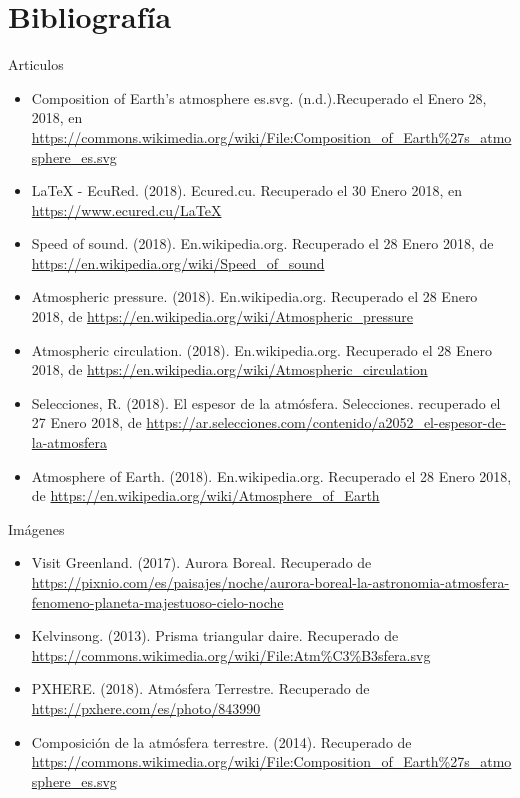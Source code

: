 \documentclass{article} %
\begin{document}
\section{Bibliografía}
Articulos
\begin{itemize}

\item Composition of Earth's atmosphere es.svg. (n.d.).Recuperado el Enero 28, 2018, en \url{https://commons.wikimedia.org/wiki/File:Composition_of_Earth%27s_atmosphere_es.svg}
\item LaTeX - EcuRed. (2018). Ecured.cu. Recuperado el 30 Enero 2018, en \url{https://www.ecured.cu/LaTeX}
\item Speed of sound. (2018). En.wikipedia.org. Recuperado el 28 Enero 2018, de \url{https://en.wikipedia.org/wiki/Speed_of_sound}
 \item Atmospheric pressure. (2018). En.wikipedia.org. Recuperado el 28 Enero 2018, de \url{https://en.wikipedia.org/wiki/Atmospheric_pressure}
\item Atmospheric circulation. (2018). En.wikipedia.org. Recuperado el 28 Enero 2018, de \url{https://en.wikipedia.org/wiki/Atmospheric_circulation}
\item Selecciones, R. (2018). El espesor de la atmósfera. Selecciones. recuperado el 27 Enero 2018, de \url{https://ar.selecciones.com/contenido/a2052_el-espesor-de-la-atmosfera}
\item Atmosphere of Earth. (2018). En.wikipedia.org. Recuperado el 28 Enero 2018, de \url{https://en.wikipedia.org/wiki/Atmosphere_of_Earth}

\end{itemize}

Imágenes

\begin{itemize}
\item Visit Greenland. (2017). Aurora Boreal. Recuperado de \url{https://pixnio.com/es/paisajes/noche/aurora-boreal-la-astronomia-atmosfera-fenomeno-planeta-majestuoso-cielo-noche}

\item Kelvinsong. (2013). Prisma triangular daire. Recuperado de  \url{https://commons.wikimedia.org/wiki/File:Atm\%C3\%B3sfera.svg}

\item PXHERE. (2018). Atmósfera Terrestre. Recuperado de \url{https://pxhere.com/es/photo/843990}

\item Composición de la atmósfera terrestre. (2014). Recuperado de  \url{https://commons.wikimedia.org/wiki/File:Composition_of_Earth%27s_atmosphere_es.svg}

\end{itemize}
\end{document}

